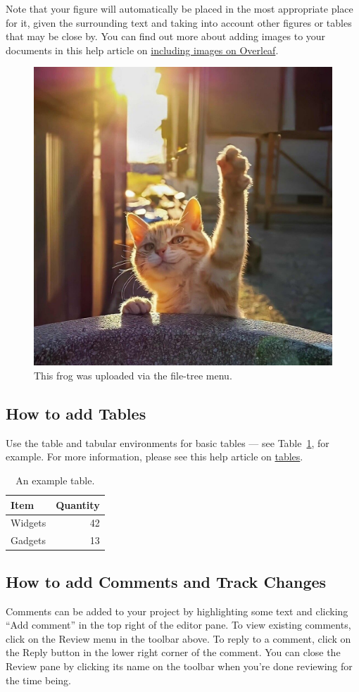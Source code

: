 \documentclass{article}
\begin{document}
	Note that your figure will automatically be placed in the most appropriate place for it, given the surrounding text and taking into account other figures or tables that may be close by. You can find out more about adding images to your documents in this help article on \href{https://www.overleaf.com/learn/how-to/Including_images_on_Overleaf}{including images on Overleaf}.
	
	\begin{figure}
		\centering
		\includegraphics[width=0.25\linewidth]{frog.jpg}
		\caption{\label{fig:frog}This frog was uploaded via the file-tree menu.}
	\end{figure}
	
	\subsection{How to add Tables}
	
	Use the table and tabular environments for basic tables --- see Table~\ref{tab:widgets}, for example. For more information, please see this help article on \href{https://www.overleaf.com/learn/latex/tables}{tables}. 
	
	\begin{table}
		\centering
		\begin{tabular}{l|r}
			Item & Quantity \\\hline
			Widgets & 42 \\
			Gadgets & 13
		\end{tabular}
		\caption{\label{tab:widgets}An example table.}
	\end{table}
	
	\subsection{How to add Comments and Track Changes}
	
	Comments can be added to your project by highlighting some text and clicking ``Add comment'' in the top right of the editor pane. To view existing comments, click on the Review menu in the toolbar above. To reply to a comment, click on the Reply button in the lower right corner of the comment. You can close the Review pane by clicking its name on the toolbar when you're done reviewing for the time being.
	
\end{document}
